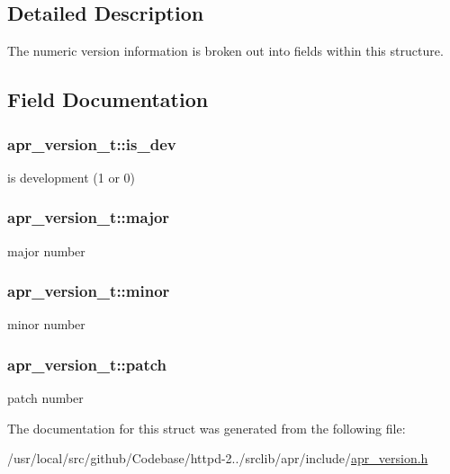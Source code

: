 \subsection{Detailed Description}
The numeric version information is broken out into fields within this structure. 

\subsection{Field Documentation}
\subsubsection[{\texorpdfstring{is\+\_\+dev}{is_dev}}]{ apr\+\_\+version\+\_\+t\+::is\+\_\+dev}\hypertarget{structapr__version__t_aadc878af1010faa53e365e1142c81ced}{}\label{structapr__version__t_aadc878af1010faa53e365e1142c81ced}
is development (1 or 0) 
\subsubsection[{\texorpdfstring{major}{major}}]{ apr\+\_\+version\+\_\+t\+::major}\hypertarget{structapr__version__t_a0ae64fee85387834ab76d9f9288373ab}{}\label{structapr__version__t_a0ae64fee85387834ab76d9f9288373ab}
major number 
\subsubsection[{\texorpdfstring{minor}{minor}}]{ apr\+\_\+version\+\_\+t\+::minor}\hypertarget{structapr__version__t_aab0a1e8362517416389631bceeeedbad}{}\label{structapr__version__t_aab0a1e8362517416389631bceeeedbad}
minor number 
\subsubsection[{\texorpdfstring{patch}{patch}}]{ apr\+\_\+version\+\_\+t\+::patch}\hypertarget{structapr__version__t_a98a629a88e776642d6e527d7535e0791}{}\label{structapr__version__t_a98a629a88e776642d6e527d7535e0791}
patch number 

The documentation for this struct was generated from the following file\+:\begin{DoxyCompactItemize}
\item 
/usr/local/src/github/\+Codebase/httpd-\/2../srclib/apr/include/\hyperlink{apr__version_8h}{apr\+\_\+version.\+h}\end{DoxyCompactItemize}

